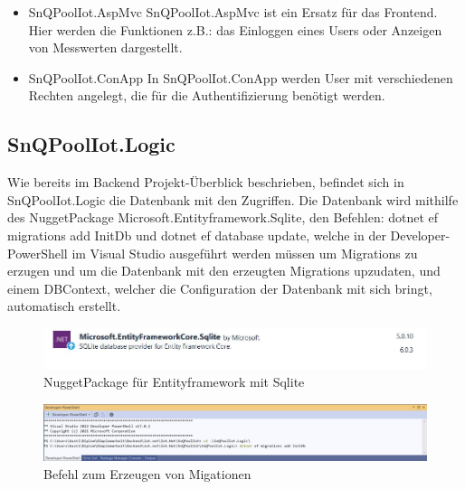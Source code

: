 \begin{itemize}
    \item SnQPoolIot.AspMvc
    SnQPoolIot.AspMvc ist ein Ersatz für das Frontend.
    Hier werden die Funktionen z.B.: das Einloggen eines Users oder Anzeigen von Messwerten dargestellt.
\end{itemize}

\begin{itemize}
    \item SnQPoolIot.ConApp
    In SnQPoolIot.ConApp werden User mit verschiedenen Rechten angelegt, die für die Authentifizierung benötigt werden.
\end{itemize}



\subsection{SnQPoolIot.Logic}
Wie  bereits im Backend Projekt-Überblick beschrieben, befindet sich in SnQPoolIot.Logic die Datenbank mit den Zugriffen.
Die Datenbank wird mithilfe des NuggetPackage Microsoft.Entityframework.Sqlite, den Befehlen:
dotnet ef migrations add InitDb und dotnet ef database update, welche in der Developer-PowerShell 
im Visual Studio ausgeführt werden müssen um Migrations zu erzugen und um die Datenbank mit den erzeugten Migrations upzudaten, 
und einem DBContext, welcher die Configuration der Datenbank mit sich bringt, automatisch erstellt. 

\begin{figure}[H]
    \centering
    \includegraphics[width=1\textwidth]{pics/EntityFrameworkSqlLiteNuggetPackage.JPG}
    \caption{NuggetPackage für Entityframework mit Sqlite}
\end{figure}


\begin{figure}[H]
    \centering
    \includegraphics[width=1\textwidth]{pics/DeveloperPowerShellMigration.JPG}
    \caption{Befehl zum Erzeugen von Migationen}
\end{figure}

